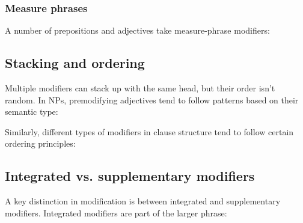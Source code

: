 \subsubsection{Measure phrases}

A number of prepositions and adjectives take measure-phrase modifiers:
\ea
    \z
    \z
\z

\subsection{Stacking and ordering}

Multiple modifiers can stack up with the same head, but their order isn't random. In NPs, premodifying adjectives tend to follow patterns based on their semantic type:

\ea\label{ex:adj-order}
   \z
\z

\noindent Similarly, different types of modifiers in clause structure tend to follow certain ordering principles:

\ea\label{ex:adv-order}
   \z
\z

\subsection{Integrated vs. supplementary modifiers}

A key distinction in modification is between integrated and supplementary modifiers. Integrated modifiers are part of the larger phrase:

\ea\label{ex:restrictive}
   \z
\z

